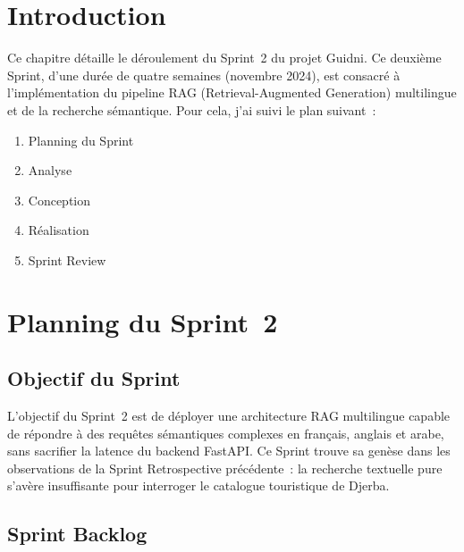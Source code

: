 
\section{Introduction}

Ce chapitre détaille le déroulement du Sprint~2 du projet Guidni. Ce deuxième Sprint, d'une
durée de quatre semaines (novembre 2024), est consacré à l'implémentation du pipeline RAG
(Retrieval-Augmented Generation) multilingue et de la recherche sémantique. Pour cela,
j'ai suivi le plan suivant~:
\begin{enumerate}
    \item Planning du Sprint
    \item Analyse
    \item Conception
    \item Réalisation
    \item Sprint Review
\end{enumerate}


\section{Planning du Sprint~2}

\subsection{Objectif du Sprint}

L'objectif du Sprint~2 est de déployer une architecture RAG multilingue capable de répondre
à des requêtes sémantiques complexes en français, anglais et arabe, sans sacrifier la latence
du backend FastAPI. Ce Sprint trouve sa genèse dans les observations de la Sprint Retrospective
précédente~: la recherche textuelle pure s'avère insuffisante pour interroger le catalogue
touristique de Djerba.

\subsection{Sprint Backlog}

